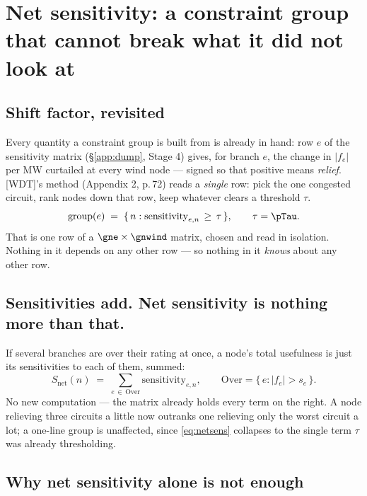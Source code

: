 \newpage
\section{Net sensitivity: a constraint group that cannot break what it did not look at}

\subsection*{Shift factor, revisited}

Every quantity a constraint group is built from is already in hand: row $e$ of
the sensitivity matrix (\S\ref{app:dump}, Stage 4) gives, for branch $e$, the
change in $|f_e|$ per MW curtailed at every wind node --- signed so that
positive means \emph{relief}. [WDT]'s method (Appendix 2, p.\,72) reads a
\emph{single} row: pick the one congested circuit, rank nodes down that row,
keep whatever clears a threshold $\tau$.
\begin{equation}
  \text{group}(e) \;=\; \{\, n : \text{sensitivity}_{e,n} \,\ge\, \tau \,\},
  \qquad \tau = \pTau .
\end{equation}
That is one row of a $\gne\times\gnwind$ matrix, chosen and read in isolation.
Nothing in it depends on any other row --- so nothing in it \emph{knows} about
any other row.

\subsection*{Sensitivities add. Net sensitivity is nothing more than that.}

If several branches are over their rating at once, a node's total usefulness is
just its sensitivities to each of them, summed:
\begin{equation}
  S_{\text{net}}(n) \;=\; \sum_{e\,\in\,\text{Over}} \text{sensitivity}_{e,n},
  \qquad \text{Over} = \{\, e : |f_e| > s_e \,\}.
  \label{eq:netsens}
\end{equation}
No new computation --- the matrix already holds every term on the right. A
node relieving three circuits a little now outranks one relieving only the
worst circuit a lot; a one-line group is unaffected, since \eqref{eq:netsens}
collapses to the single term $\tau$ was already thresholding.

\subsection*{Why net sensitivity alone is not enough}

